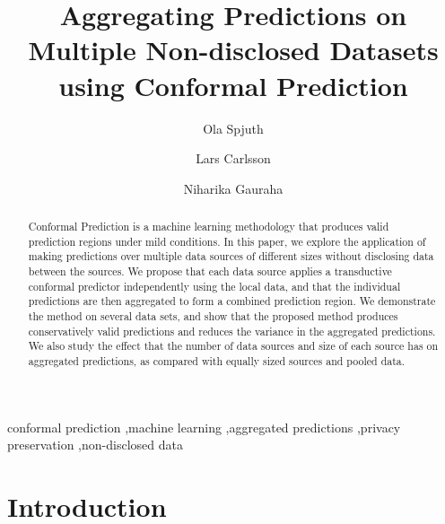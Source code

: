 \documentclass[preprint,12pt,authoryear]{elsarticle}
\begin{document}
\begin{frontmatter}

\title{Aggregating Predictions on Multiple Non-disclosed Datasets using Conformal Prediction}

\author[label1]{Ola Spjuth}
\author[label2,label3]{Lars Carlsson}
\author[label1]{Niharika Gauraha}


\address[label1]{Department of Pharmaceutical Biosciences \\
       Uppsala University\\
       Uppsala, Sweden}
\address[label2]{Department of Computer Science, \\Royal Holloway, University of London, \\Egham Hill, Egham, Surrey, United Kingdom}
\address[label3]{Stena Line, Gothenburg, Sweden}


\begin{abstract}
Conformal Prediction is a machine learning methodology that produces valid prediction regions under mild conditions. 
In this paper, we explore the application of making predictions over multiple data sources of different sizes without disclosing data between the sources.
We propose that each data source applies a transductive conformal predictor independently using the local data, and that the individual predictions are then aggregated to form a combined prediction region. We demonstrate the method on several data sets, and show that the proposed method produces conservatively valid predictions and reduces the variance in the aggregated predictions. We also study the effect that the number of data sources and size of each source has on aggregated predictions, as compared with equally sized sources and pooled data.
\end{abstract}
\begin{keyword}


conformal prediction \sep machine learning \sep aggregated predictions \sep privacy preservation \sep non-disclosed data
\end{keyword}

\end{frontmatter}

\section{Introduction}
\end{document}
